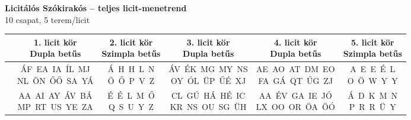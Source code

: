 \documentclass[11pt]{extarticle}
\begin{document}
\begin{center}
{\Large \textbf{Licitálós Szókirakós -- teljes licit-menetrend}}\\[4pt]
{\small 10 csapat, 5 terem/licit}
\end{center}
\vspace{8pt}

\begin{center}
\begin{tabular}{|lccccc|}
\hline
 & \shortstack{\rule{0pt}{3.4ex}\textbf{1. licit kör} \\ Dupla betűs\rule[-1.4ex]{0pt}{0pt}} & \shortstack{\rule{0pt}{3.4ex}\textbf{2. licit kör} \\ Szimpla betűs\rule[-1.4ex]{0pt}{0pt}} & \shortstack{\rule{0pt}{3.4ex}\textbf{3. licit kör} \\ Dupla betűs\rule[-1.4ex]{0pt}{0pt}} & \shortstack{\rule{0pt}{3.4ex}\textbf{4. licit kör} \\ Dupla betűs\rule[-1.4ex]{0pt}{0pt}} & \shortstack{\rule{0pt}{3.4ex}\textbf{5. licit kör} \\ Szimpla betűs\rule[-1.4ex]{0pt}{0pt}} \\ \hline
\textbf{\rule{0pt}{3.4ex}11. terem\rule[-1.4ex]{0pt}{0pt}} & \shortstack{\rule{0pt}{3.4ex}ÁF~EA~IA~ÍL~MJ \\ NL~ÖN~ŐŐ~SA~YÁ\rule[-1.4ex]{0pt}{0pt}} & \shortstack{\rule{0pt}{3.4ex}Á~H~H~L~N \\ Ö~Ő~P~V~Z\rule[-1.4ex]{0pt}{0pt}} & \shortstack{\rule{0pt}{3.4ex}ÁV~ÉK~MG~MY~NS \\ OY~ÓL~ÜP~ŰÉ~XJ\rule[-1.4ex]{0pt}{0pt}} & \shortstack{\rule{0pt}{3.4ex}AE~AO~AT~DM~EO \\ FA~GÁ~QT~ŰG~ZJ\rule[-1.4ex]{0pt}{0pt}} & \shortstack{\rule{0pt}{3.4ex}A~E~E~É~L \\ O~Ö~W~Y~Y\rule[-1.4ex]{0pt}{0pt}} \\ \hline
\textbf{\rule{0pt}{3.4ex}14. terem\rule[-1.4ex]{0pt}{0pt}} & \shortstack{\rule{0pt}{3.4ex}AA~AI~AY~ÁV~BÁ \\ MP~RT~US~YE~ZA\rule[-1.4ex]{0pt}{0pt}} & \shortstack{\rule{0pt}{3.4ex}É~É~L~M~Ő \\ Q~S~U~Y~Z\rule[-1.4ex]{0pt}{0pt}} & \shortstack{\rule{0pt}{3.4ex}CL~GÚ~HÁ~HÉ~IC \\ KR~NS~OU~SG~ÜH\rule[-1.4ex]{0pt}{0pt}} & \shortstack{\rule{0pt}{3.4ex}AA~ÉV~GA~IE~JÓ \\ LX~OO~OR~ÖA~ÖÓ\rule[-1.4ex]{0pt}{0pt}} & \shortstack{\rule{0pt}{3.4ex}Á~D~K~M~N \\ P~R~R~Ü~Y\rule[-1.4ex]{0pt}{0pt}} \\ \hline

\end{tabular}
\end{center}
\end{document}
